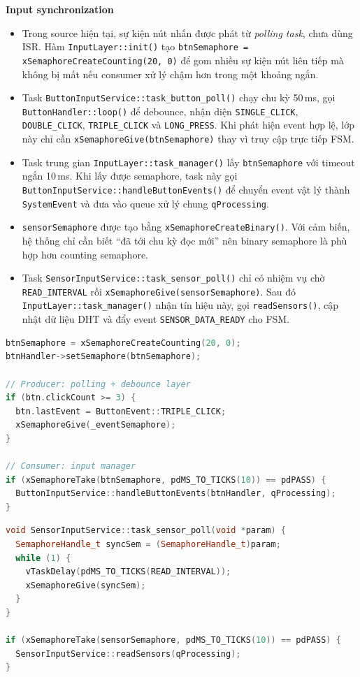 \textbf{Input synchronization}
\begin{itemize}
    \item Trong source hiện tại, sự kiện nút nhấn được phát từ \textit{polling task}, chưa dùng ISR. Hàm \texttt{InputLayer::init()} tạo \texttt{btnSemaphore = xSemaphoreCreateCounting(20, 0)} để gom nhiều sự kiện nút liên tiếp mà không bị mất nếu consumer xử lý chậm hơn trong một khoảng ngắn.
    \item Task \texttt{ButtonInputService::task\_button\_poll()} chạy chu kỳ 50\,ms, gọi \texttt{ButtonHandler::loop()} để debounce, nhận diện \texttt{SINGLE\_CLICK}, \texttt{DOUBLE\_CLICK}, \texttt{TRIPLE\_CLICK} và \texttt{LONG\_PRESS}. Khi phát hiện event hợp lệ, lớp này chỉ cần \texttt{xSemaphoreGive(btnSemaphore)} thay vì truy cập trực tiếp FSM.
    \item Task trung gian \texttt{InputLayer::task\_manager()} lấy \texttt{btnSemaphore} với timeout ngắn 10\,ms. Khi lấy được semaphore, task này gọi \texttt{ButtonInputService::handleButtonEvents()} để chuyển event vật lý thành \texttt{SystemEvent} và đưa vào queue xử lý chung \texttt{qProcessing}.
    \item \texttt{sensorSemaphore} được tạo bằng \texttt{xSemaphoreCreateBinary()}. Với cảm biến, hệ thống chỉ cần biết ``đã tới chu kỳ đọc mới'' nên binary semaphore là phù hợp hơn counting semaphore.
    \item Task \texttt{SensorInputService::task\_sensor\_poll()} chỉ có nhiệm vụ chờ \texttt{READ\_INTERVAL} rồi \texttt{xSemaphoreGive(sensorSemaphore)}. Sau đó \texttt{InputLayer::task\_manager()} nhận tín hiệu này, gọi \texttt{readSensors()}, cập nhật dữ liệu DHT và đẩy event \texttt{SENSOR\_DATA\_READY} cho FSM.
\end{itemize}

\begin{lstlisting}[language=C++,caption={Counting semaphore cho luong nut nhan}]
btnSemaphore = xSemaphoreCreateCounting(20, 0);
btnHandler->setSemaphore(btnSemaphore);

// Producer: polling + debounce layer
if (btn.clickCount >= 3) {
  btn.lastEvent = ButtonEvent::TRIPLE_CLICK;
  xSemaphoreGive(_eventSemaphore);
}

// Consumer: input manager
if (xSemaphoreTake(btnSemaphore, pdMS_TO_TICKS(10)) == pdPASS) {
  ButtonInputService::handleButtonEvents(btnHandler, qProcessing);
}
\end{lstlisting}

\begin{lstlisting}[language=C++,caption={Binary semaphore cho chu ky doc cam bien}]
void SensorInputService::task_sensor_poll(void *param) {
  SemaphoreHandle_t syncSem = (SemaphoreHandle_t)param;
  while (1) {
    vTaskDelay(pdMS_TO_TICKS(READ_INTERVAL));
    xSemaphoreGive(syncSem);
  }
}

if (xSemaphoreTake(sensorSemaphore, pdMS_TO_TICKS(10)) == pdPASS) {
  SensorInputService::readSensors(qProcessing);
}
\end{lstlisting}

